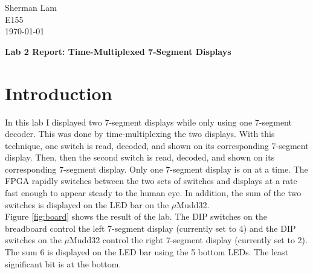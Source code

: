\documentclass[11pt]{article}
\begin{document}
\begin{flushleft}
Sherman Lam
\\E155
\\ \today
\end{flushleft}


\begin{center}
\begin{Large}
\textbf{Lab 2 Report: Time-Multiplexed 7-Segment Displays}
\end{Large}
\end{center}




\section{Introduction}
\label{sec:intro}

In this lab I displayed two 7-segment displays while only using one 7-segment decoder. This was done by time-multiplexing the two displays. With this technique, one switch is read, decoded, and shown on its corresponding 7-segment display. Then, then the second switch is read, decoded, and shown on its corresponding 7-segment display. Only one 7-segment display is on at a time. The FPGA rapidly switches between the two sets of switches and displays at a rate fast enough to appear steady to the human eye. In addition, the sum of the two switches is displayed on the LED bar on the $\mu$Mudd32. \\

Figure \ref{fig:board} shows the result of the lab. The DIP switches on the breadboard control the left 7-segment display (currently set to 4) and the DIP switches on the $\mu$Mudd32 control the right 7-segment display (currently set to 2). The sum 6 is displayed on the LED bar using the 5 bottom LEDs. The least significant bit is at the bottom. 
\end{document}
